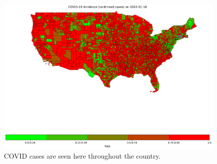 \documentclass[sigconf,screen,nonacm]{acmart}
\begin{document}
\begin{figure}[h]
  \centering
  \includegraphics[width=1\linewidth]{Figures/IncidenceRate_covidCase_2022-01-18.png}
  
  \caption{COVID cases are seen here throughout the country.}
\end{figure}
\end{document}
